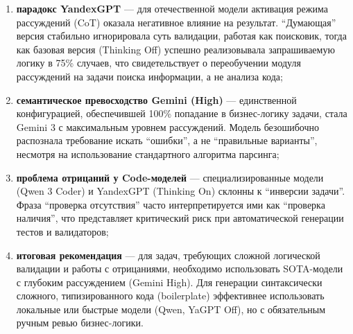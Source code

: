 \begin{enumerate}
    \item \textbf{парадокс YandexGPT} --- для отечественной модели активация режима рассуждений (CoT) оказала негативное влияние на результат. ``Думающая'' версия стабильно игнорировала суть валидации, работая как поисковик, тогда как базовая версия (Thinking Off) успешно реализовывала запрашиваемую логику в 75\% случаев, что свидетельствует о переобучении модуля рассуждений на задачи поиска информации, а не анализа кода;
    
    \item \textbf{семантическое превосходство Gemini (High)} --- единственной конфигурацией, обеспечившей 100\% попадание в бизнес-логику задачи, стала Gemini 3 с максимальным уровнем рассуждений. Модель безошибочно распознала требование искать ``ошибки'', а не ``правильные варианты'', несмотря на использование стандартного алгоритма парсинга;
    
    \item \textbf{проблема отрицаний у Code-моделей} --- специализированные модели (Qwen 3 Coder) и YandexGPT (Thinking On) склонны к ``инверсии задачи''. Фраза ``проверка отсутствия'' часто интерпретируется ими как ``проверка наличия'', что представляет критический риск при автоматической генерации тестов и валидаторов;
    
    \item \textbf{итоговая рекомендация} --- для задач, требующих сложной логической валидации и работы с отрицаниями, необходимо использовать SOTA-модели с глубоким рассуждением (Gemini High). Для генерации синтаксически сложного, типизированного кода (boilerplate) эффективнее использовать локальные или быстрые модели (Qwen, YaGPT Off), но с обязательным ручным ревью бизнес-логики.
\end{enumerate}

\clearpage